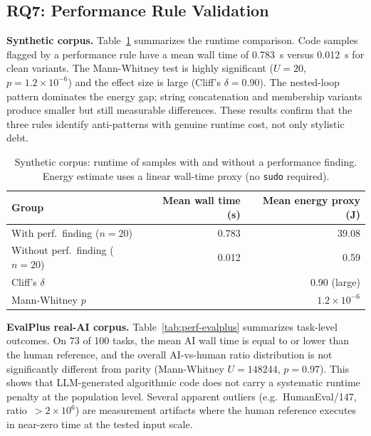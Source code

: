 \documentclass[sigconf,nonacm]{acmart}
\begin{document}
\subsection{RQ7: Performance Rule Validation}

\textbf{Synthetic corpus.}
Table~\ref{tab:perf-synthetic} summarizes the runtime comparison. Code samples
flagged by a performance rule have a mean wall time of 0.783~s versus 0.012~s
for clean variants. The Mann-Whitney test is highly significant
($U=20$, $p=1.2\times10^{-6}$) and the effect size is large (Cliff's
$\delta=0.90$). The nested-loop pattern dominates the energy gap; string
concatenation and membership variants produce smaller but still
measurable differences. These results confirm that the three rules identify
anti-patterns with genuine runtime cost, not only stylistic debt.

\begin{table}[t]
\caption{Synthetic corpus: runtime of samples with and without a performance
finding. Energy estimate uses a linear wall-time proxy (no \texttt{sudo}
required).}
\label{tab:perf-synthetic}
\centering
\small
\begin{tabular}{lrr}
\toprule
Group & Mean wall time (s) & Mean energy proxy (J) \\
\midrule
With perf.\ finding ($n=20$) & 0.783 & 39.08 \\
Without perf.\ finding ($n=20$) & 0.012 & 0.59 \\
\midrule
Cliff's $\delta$ & \multicolumn{2}{r}{0.90 (large)} \\
Mann-Whitney $p$ & \multicolumn{2}{r}{$1.2\times10^{-6}$} \\
\bottomrule
\end{tabular}
\end{table}

\textbf{EvalPlus real-AI corpus.}
Table~\ref{tab:perf-evalplus} summarizes task-level outcomes. On 73 of 100
tasks, the mean AI wall time is equal to or lower than the human reference,
and the overall AI-vs-human ratio distribution is not significantly different
from parity (Mann-Whitney $U=148244$, $p=0.97$). This shows that LLM-generated
algorithmic code does not carry a systematic runtime penalty at the population
level. Several apparent outliers (e.g.\ HumanEval/147, ratio~$>2\times10^6$)
are measurement artifacts where the human reference executes in near-zero time
at the tested input scale.
\end{document}
